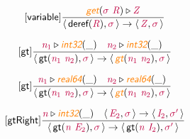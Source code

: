 \documentclass[10pt,leqno,fleqn]{article}
\newcommand{\artVariable}[1]{\mbox{\color{purple}\em #1\/}}
\newcommand{\artConstructor}[1]{\mbox{\sf #1}}
\newcommand{\artSpecial}[1]{\mbox{\color{orange}\sf\em #1}}
\begin{document}
\begin{equation}
\tag*{[\artConstructor{\sf variable}]}
\begin{split}\frac{ \artSpecial{get}(\artVariable{$\sigma$}\ \artVariable{R})\triangleright \artVariable{Z} }{\langle\, \artConstructor{\sf deref}(\artVariable{R}), \artVariable{$\sigma$}\,\rangle \rightarrow \langle\, \artVariable{Z}, \artVariable{$\sigma$}\,\rangle }
\end{split}
\end{equation}

\begin{equation}
\tag*{[\artConstructor{\sf gt}]}
\begin{split}\frac{ \artVariable{n$_{1}$}\triangleright \artSpecial{int32}(\_) \quad  \artVariable{n$_{2}$}\triangleright \artSpecial{int32}(\_) }{\langle\, \artConstructor{\sf gt}(\artVariable{n$_{1}$}\ \artVariable{n$_{2}$}), \artVariable{$\sigma$}\,\rangle \rightarrow \langle\, \artSpecial{gt}(\artVariable{n$_{1}$}\ \artVariable{n$_{2}$}), \artVariable{$\sigma$}\,\rangle }
\end{split}
\end{equation}

\begin{equation}
\tag*{[\artConstructor{\sf gt}]}
\begin{split}\frac{ \artVariable{n$_{1}$}\triangleright \artSpecial{real64}(\_) \quad  \artVariable{n$_{2}$}\triangleright \artSpecial{real64}(\_) }{\langle\, \artConstructor{\sf gt}(\artVariable{n$_{1}$}\ \artVariable{n$_{2}$}), \artVariable{$\sigma$}\,\rangle \rightarrow \langle\, \artSpecial{gt}(\artVariable{n$_{1}$}\ \artVariable{n$_{2}$}), \artVariable{$\sigma$}\,\rangle }
\end{split}
\end{equation}

\begin{equation}
\tag*{[\artConstructor{\sf gtRight}]}
\begin{split}\frac{ \artVariable{n}\triangleright \artSpecial{int32}(\_) \quad \langle\, \artVariable{E$_{2}$}, \artVariable{$\sigma$}\,\rangle \rightarrow \langle\, \artVariable{I$_{2}$}, \artVariable{$\sigma$\/$^\prime$}\,\rangle }{\langle\, \artConstructor{\sf gt}(\artVariable{n}\ \artVariable{E$_{2}$}), \artVariable{$\sigma$}\,\rangle \rightarrow \langle\, \artConstructor{\sf gt}(\artVariable{n}\ \artVariable{I$_{2}$}), \artVariable{$\sigma$\/$^\prime$}\,\rangle }
\end{split}
\end{equation}
\end{document}
